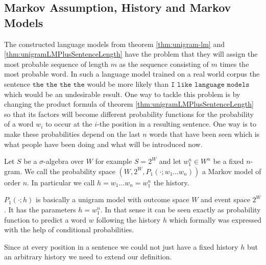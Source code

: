 \documentclass[•]{book}
\begin{document}
\subsection{Markov Assumption, History and Markov Models}
The constructed language models from theorem \ref{thm:unigram-lm} and \ref{thm:unigramLMPlusSentenceLength} have the problem that they will assign the most probable sequence of length $m$ as the sequence consisting of $m$ times the most probable word.
In such a language model trained on a real world corpus the sentence $\texttt{the the the the}$ would be more likely than $\texttt{I like language models}$ which would be an undesirable result. 
One way to tackle this problem is by changing the product formula of theorem \ref{thm:unigramLMPlusSentenceLength} so that its factors will become different probability functions for the probability of a word $w_i$ to occur at the $i$-the position in a resulting sentence.
One way is to make these probabilities depend on the last $n$ words that have been seen which is what people have been doing and what will be introduced now.

\begin{definition}
Let $S$ be a $\sigma$-algebra over $W$ for example $S=2^W$ and let $w_1^n\in W^n$ be a fixed $n$-gram.
We call the probability space $(W,2^W, P_1(\cdot ;w_1\dots w_n))$ a Markov model of order $n$. 
In particular we call $h=w_1\dots w_n = w_1^n$ the history.  
\end{definition}

\begin{remark}
$P_1(\cdot ; h)$ is basically a unigram model with outcome space $W$ and event space $2^W$. 
It has the parameters $h = w_1^n$.  
In that sense it can be seen exactly as probability function to predict a word $w$ following the history $h$ which formally was expressed with the help of conditional probabilities. 
\end{remark} 

Since at every position in a sentence we could not just have a fixed history $h$ but an arbitrary history we need to extend our definition.
\end{document}
